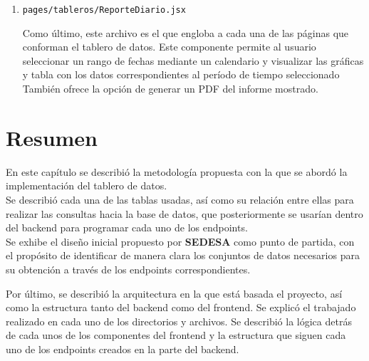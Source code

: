 \begin{enumerate}
\item \texttt{pages/tableros/ReporteDiario.jsx}

Como último, este archivo es el que engloba a cada una de las páginas que conforman el tablero de datos. Este componente permite al usuario seleccionar un rango de fechas mediante un calendario y visualizar las gráficas y tabla con los datos correspondientes al período de tiempo seleccionado También ofrece la opción de generar un PDF del informe mostrado. 

\end{enumerate}

\section{Resumen}
En este capítulo se describió la metodología propuesta con la que se abordó la implementación del tablero de datos.\\

Se describió cada una de las tablas usadas, así como su relación entre ellas para realizar las consultas hacia la base de datos, que posteriormente se usarían dentro del backend para programar cada uno de los endpoints.\\
Se exhibe el diseño inicial propuesto por \textbf{SEDESA} como punto de partida, con el propósito de identificar de manera clara los conjuntos de datos necesarios para su obtención a través de los endpoints correspondientes.

Por último, se describió la arquitectura en la que está basada el proyecto, así como la estructura tanto del backend como del frontend. Se explicó el trabajado realizado en cada uno de los directorios y archivos. Se describió la lógica detrás de cada unos de los componentes del frontend y la estructura que siguen cada uno de los endpoints creados en la parte del backend.



 

